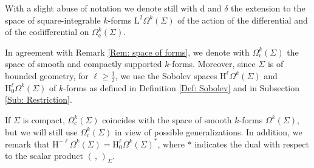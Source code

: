 \begin{remark}\label{Rem: abuse of notation}
	With a slight abuse of notation we denote still with $\mathrm{d}$ and $\delta$ the extension to the space of square-integrable $k$-forms $\mathrm{L}^2\Omega^k(\Sigma)$ of the action of the differential and of the codifferential on $\Omega^k_{\mathrm{c}}(\Sigma)$.
\end{remark}

\begin{remark}
	In agreement with Remark \ref{Rem: space of forms}, we denote with $\Omega_\mathrm{c}^k(\Sigma)$ the space of smooth and compactly supported $k$-forms. Moreover, since $\Sigma$ is of bounded geometry, for $\ell\geq\frac12$, we use the Sobolev spaces $\mathrm{H}^\ell\Omega^k(\Sigma)$ and $\mathrm{H}_0^\ell\Omega^k(\Sigma)$ of $k$-forms as defined in Definition \ref{Def: Sobolev} and in Subsection \ref{Sub: Restriction}.
	
	If $\Sigma$ is compact, $\Omega_\mathrm{c}^k(\Sigma)$ coincides with the space of smooth $k$-forms $\Omega^k(\Sigma)$, but we will still use $\Omega_{\mathrm{c}}^k(\Sigma)$ in view of possible generalizations. In addition, we remark that $\mathrm{H}^{-\ell}\Omega^k(\Sigma)=\mathrm{H}_0^\ell\Omega^k(\Sigma)^*$, where $\ast$ indicates the dual with respect to the scalar product $(\,,\,)_\Sigma$.
\end{remark}



